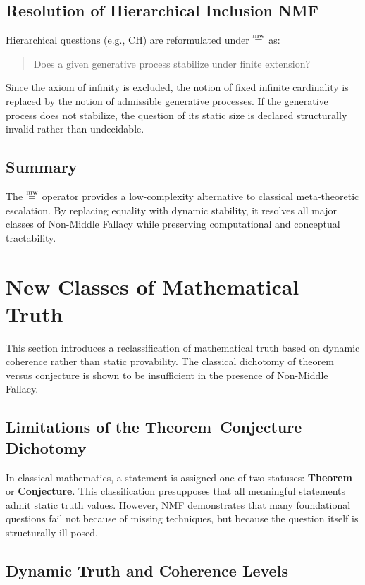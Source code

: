 \documentclass[11pt]{article}
\begin{document}
\subsection{Resolution of Hierarchical Inclusion NMF}

Hierarchical questions (e.g., CH) are reformulated under $\mathrel{\overset{\mathrm{mw}}{=}}$ as:
\begin{quote}
Does a given generative process stabilize under finite extension?
\end{quote}

Since the axiom of infinity is excluded, the notion of fixed infinite
cardinality is replaced by the notion of admissible generative processes.
If the generative process does not stabilize, the question of its
static size is declared structurally invalid rather than undecidable.

\subsection{Summary}

The $\mathrel{\overset{\mathrm{mw}}{=}}$ operator provides a low-complexity alternative to classical
meta-theoretic escalation.
By replacing equality with dynamic stability, it resolves all major
classes of Non-Middle Fallacy while preserving computational and
conceptual tractability.


\section{New Classes of Mathematical Truth}

This section introduces a reclassification of mathematical truth based
on dynamic coherence rather than static provability.
The classical dichotomy of theorem versus conjecture is shown to be
insufficient in the presence of Non-Middle Fallacy.

\subsection{Limitations of the Theorem--Conjecture Dichotomy}

In classical mathematics, a statement is assigned one of two statuses:
\textbf{Theorem} or \textbf{Conjecture}.
This classification presupposes that all meaningful statements admit
static truth values.
However, NMF demonstrates that many foundational questions fail not
because of missing techniques, but because the question itself is
structurally ill-posed.

\subsection{Dynamic Truth and Coherence Levels}
\end{document}
